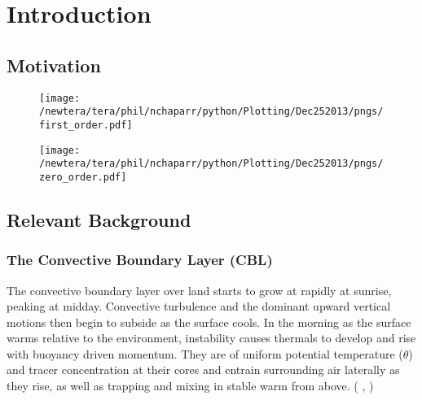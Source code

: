 
\chapter{Introduction} 
\label{ch:Introduction}
\setlength{\parindent}{0cm}

\section{Motivation}
\label{sec:}

\begin{figure}[htbp]
    \centering
    \texttt{[image: /newtera/tera/phil/nchaparr/python/Plotting/Dec252013/pngs/first\_order.pdf]}
    \caption{}
    \label{fig:}   %
\end{figure}

\begin{figure}[htbp]
    \centering
    \texttt{[image: /newtera/tera/phil/nchaparr/python/Plotting/Dec252013/pngs/zero\_order.pdf]}
    \caption{}
    \label{fig:}   %
\end{figure}


\section{Relevant Background}
\label{sec:}
\subsection{The Convective Boundary Layer (CBL)}

The convective boundary layer over land starts to grow at rapidly at sunrise, peaking at midday.  Convective turbulence and the dominant upward vertical motions then begin to subside as the surface cools. In the morning as the surface warms relative to the environment, instability causes thermals to develop and rise with buoyancy driven momentum. They are of uniform potential temperature ($\theta$) and tracer 
concentration at their cores and entrain surrounding air laterally as they rise, as well as trapping and mixing in stable warm from above. 
(\citeauthor{Stull-BLMetIntro} \cite{Stull-BLMetIntro}, \citeauthor{CrumStullEl} \cite{CrumStullEl})\\

